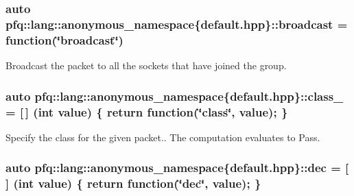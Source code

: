 \subsubsection[{\texorpdfstring{broadcast}{broadcast}}]{\setlength{\rightskip}{0pt plus 5cm}auto pfq\+::lang\+::anonymous\+\_\+namespace\{default.\+hpp\}\+::broadcast = {\bf function}(\char`\"{}broadcast\char`\"{})}\hypertarget{namespacepfq_1_1lang_1_1anonymous__namespace_02default_8hpp_03_ac9e0f3ad7fa32146565f4aaab709d19d}{}\label{namespacepfq_1_1lang_1_1anonymous__namespace_02default_8hpp_03_ac9e0f3ad7fa32146565f4aaab709d19d}


Broadcast the packet to all the sockets that have joined the group. 

\subsubsection[{\texorpdfstring{class\+\_\+}{class_}}]{\setlength{\rightskip}{0pt plus 5cm}auto pfq\+::lang\+::anonymous\+\_\+namespace\{default.\+hpp\}\+::class\+\_\+ = \mbox{[}$\,$\mbox{]} (int value) \{ return {\bf function}(\char`\"{}class\char`\"{}, value); \}}\hypertarget{namespacepfq_1_1lang_1_1anonymous__namespace_02default_8hpp_03_a73e1198ca0a5077b083d7900cff17505}{}\label{namespacepfq_1_1lang_1_1anonymous__namespace_02default_8hpp_03_a73e1198ca0a5077b083d7900cff17505}


Specify the class for the given packet.. The computation evaluates to {\ttfamily Pass}. 

\subsubsection[{\texorpdfstring{dec}{dec}}]{\setlength{\rightskip}{0pt plus 5cm}auto pfq\+::lang\+::anonymous\+\_\+namespace\{default.\+hpp\}\+::dec = \mbox{[}$\,$\mbox{]} (int value) \{ return {\bf function}(\char`\"{}dec\char`\"{}, value); \}}\hypertarget{namespacepfq_1_1lang_1_1anonymous__namespace_02default_8hpp_03_a139906841e77a2eb86b761b27ceeb685}{}\label{namespacepfq_1_1lang_1_1anonymous__namespace_02default_8hpp_03_a139906841e77a2eb86b761b27ceeb685}


